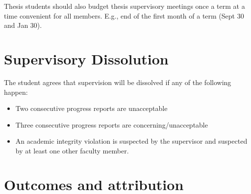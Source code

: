 \documentclass[12pt]{article}
\begin{document}
Thesis students should also budget thesis supervisory  meetings once a term at a time convenient for all members. E.g., end of the first month of a term (Sept 30 and Jan 30).
	\section{Supervisory Dissolution}
	The student agrees that supervision will be dissolved if any of the following happen:
	\begin{itemize}
	\item Two consecutive progress reports are unacceptable
	\item Three consecutive progress reports are concerning/unacceptable
	\item An academic integrity violation is suspected by the supervisor and suspected by at least one other faculty member.
	\end{itemize}
	
	\section{Outcomes and attribution}
	
	
		
	
	
\end{document}
